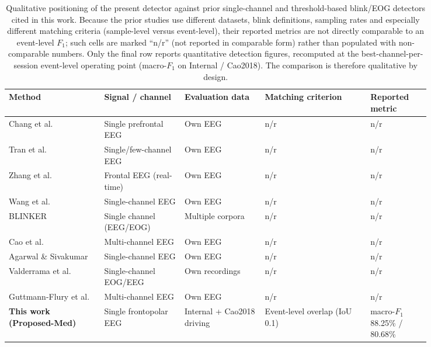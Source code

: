 \begin{table}[H]
  \centering
  \caption{Qualitative positioning of the present detector against prior single-channel and threshold-based blink/EOG detectors cited in this work. Because the prior studies use different datasets, blink definitions, sampling rates and especially different matching criteria (sample-level versus event-level), their reported metrics are not directly comparable to an event-level $F_1$; such cells are marked ``n/r'' (not reported in comparable form) rather than populated with non-comparable numbers. Only the final row reports quantitative detection figures, recomputed at the best-channel-per-session event-level operating point (macro-$F_1$ on Internal / Cao2018). The comparison is therefore qualitative by design.}
  \label{tab:literature_comparison}
  \setlength{\tabcolsep}{4pt}
  \begin{tabular}{p{0.19\linewidth}p{0.16\linewidth}p{0.16\linewidth}p{0.21\linewidth}p{0.12\linewidth}}
    \toprule
    Method & Signal / channel & Evaluation data & Matching criterion & Reported metric \\
    \midrule
    Chang et al.~\citep{chang2016detection} & Single prefrontal EEG & Own EEG & n/r & n/r \\
    Tran et al.~\citep{tran2021detection} & Single/few-channel EEG & Own EEG & n/r & n/r \\
    Zhang et al.~\citep{zhang2023method} & Frontal EEG (real-time) & Own EEG & n/r & n/r \\
    Wang et al.~\citep{wang2025sliding} & Single-channel EEG & Own EEG & n/r & n/r \\
    BLINKER~\citep{kleifges2017blinker} & Single channel (EEG/EOG) & Multiple corpora & n/r & n/r \\
    Cao et al.~\citep{cao2021unsupervised} & Multi-channel EEG & Own EEG & n/r & n/r \\
    Agarwal \& Sivakumar~\citep{agarwal2019blink} & Single-channel EEG & Own EEG & n/r & n/r \\
    Valderrama et al.~\citep{valderrama2018automatic} & Single-channel EOG/EEG & Own recordings & n/r & n/r \\
    Guttmann-Flury et al.~\citep{guttmann2019new} & Multi-channel EEG & Own EEG & n/r & n/r \\
    \midrule
    \textbf{This work (Proposed-Med)} & Single frontopolar EEG & Internal + Cao2018 driving & Event-level overlap (IoU 0.1) & macro-$F_1$ 88.25\% / 80.68\% \\
    \bottomrule
  \end{tabular}
\end{table}

